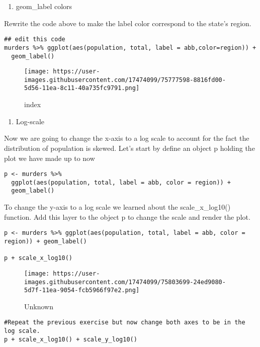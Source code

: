 \documentclass[]{article}
\providecommand{\tightlist}{%
  \setlength{\itemsep}{0pt}\setlength{\parskip}{0pt}}
\begin{document}
\begin{enumerate}
\def\labelenumi{\arabic{enumi}.}
\setcounter{enumi}{11}
\tightlist
\item
  geom\_label colors
\end{enumerate}

Rewrite the code above to make the label color correspond to the state's
region.

\begin{verbatim}
## edit this code
murders %>% ggplot(aes(population, total, label = abb,color=region)) +
  geom_label()
\end{verbatim}

\begin{figure}
\centering
\texttt{[image: https://user-images.githubusercontent.com/17474099/75777598-8816fd00-5d56-11ea-8c11-40a735fc9791.png]}
\caption{index}
\end{figure}

\begin{enumerate}
\def\labelenumi{\arabic{enumi}.}
\setcounter{enumi}{12}
\tightlist
\item
  Log-scale
\end{enumerate}

Now we are going to change the x-axis to a log scale to account for the
fact the distribution of population is skewed. Let's start by define an
object p holding the plot we have made up to now

\begin{verbatim}
p <- murders %>% 
  ggplot(aes(population, total, label = abb, color = region)) +
  geom_label() 
\end{verbatim}

To change the y-axis to a log scale we learned about the
scale\_x\_log10() function. Add this layer to the object p to change the
scale and render the plot.

\begin{verbatim}
p <- murders %>% ggplot(aes(population, total, label = abb, color = region)) + geom_label()

p + scale_x_log10()
\end{verbatim}

\begin{figure}
\centering
\texttt{[image: https://user-images.githubusercontent.com/17474099/75803699-24ed9080-5d7f-11ea-9054-fcb5966f97e2.png]}
\caption{Unknown}
\end{figure}

\begin{verbatim}
#Repeat the previous exercise but now change both axes to be in the log scale.
p + scale_x_log10() + scale_y_log10()
\end{verbatim}
\end{document}
